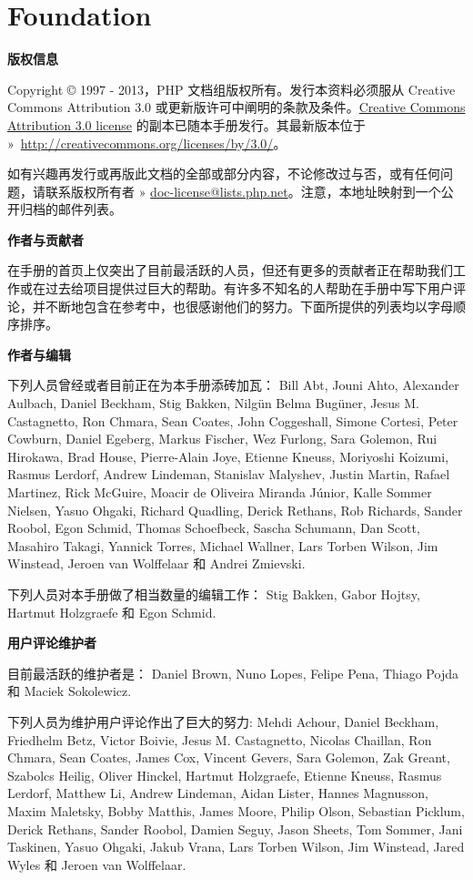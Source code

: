 \part{Foundation}

{\CTEXnoindent\textbf{版权信息}}


Copyright © 1997 - 2013，PHP 文档组版权所有。发行本资料必须服从 Creative Commons Attribution 3.0 或更新版许可中阐明的条款及条件。\href{http://www.php.net/manual/zh/cc.license.php}{Creative Commons Attribution 3.0 license} 的副本已随本手册发行。其最新版本位于 »~\url{http://creativecommons.org/licenses/by/3.0/}。

如有兴趣再发行或再版此文档的全部或部分内容，不论修改过与否，或有任何问题，请联系版权所有者 » \href{doc-license@lists.php.net}{doc-license@lists.php.net}。注意，本地址映射到一个公开归档的邮件列表。

{\CTEXnoindent\textbf{作者与贡献者}}

在手册的首页上仅突出了目前最活跃的人员，但还有更多的贡献者正在帮助我们工作或在过去给项目提供过巨大的帮助。有许多不知名的人帮助在手册中写下用户评论，并不断地包含在参考中，也很感谢他们的努力。下面所提供的列表均以字母顺序排序。

{\CTEXnoindent\textbf{作者与编辑}}

下列人员曾经或者目前正在为本手册添砖加瓦： Bill Abt, Jouni Ahto, Alexander Aulbach, Daniel Beckham, Stig Bakken, Nilgün Belma Bugüner, Jesus M. Castagnetto, Ron Chmara, Sean Coates, John Coggeshall, Simone Cortesi, Peter Cowburn, Daniel Egeberg, Markus Fischer, Wez Furlong, Sara Golemon, Rui Hirokawa, Brad House, Pierre-Alain Joye, Etienne Kneuss, Moriyoshi Koizumi, Rasmus Lerdorf, Andrew Lindeman, Stanislav Malyshev, Justin Martin, Rafael Martinez, Rick McGuire, Moacir de Oliveira Miranda Júnior, Kalle Sommer Nielsen, Yasuo Ohgaki, Richard Quadling, Derick Rethans, Rob Richards, Sander Roobol, Egon Schmid, Thomas Schoefbeck, Sascha Schumann, Dan Scott, Masahiro Takagi, Yannick Torres, Michael Wallner, Lars Torben Wilson, Jim Winstead, Jeroen van Wolffelaar 和 Andrei Zmievski.

下列人员对本手册做了相当数量的编辑工作： Stig Bakken, Gabor Hojtsy, Hartmut Holzgraefe 和 Egon Schmid.


{\CTEXnoindent\textbf{用户评论维护者}}

目前最活跃的维护者是： Daniel Brown, Nuno Lopes, Felipe Pena, Thiago Pojda 和 Maciek Sokolewicz.

下列人员为维护用户评论作出了巨大的努力: Mehdi Achour, Daniel Beckham, Friedhelm Betz, Victor Boivie, Jesus M. Castagnetto, Nicolas Chaillan, Ron Chmara, Sean Coates, James Cox, Vincent Gevers, Sara Golemon, Zak Greant, Szabolcs Heilig, Oliver Hinckel, Hartmut Holzgraefe, Etienne Kneuss, Rasmus Lerdorf, Matthew Li, Andrew Lindeman, Aidan Lister, Hannes Magnusson, Maxim Maletsky, Bobby Matthis, James Moore, Philip Olson, Sebastian Picklum, Derick Rethans, Sander Roobol, Damien Seguy, Jason Sheets, Tom Sommer, Jani Taskinen, Yasuo Ohgaki, Jakub Vrana, Lars Torben Wilson, Jim Winstead, Jared Wyles 和 Jeroen van Wolffelaar.

